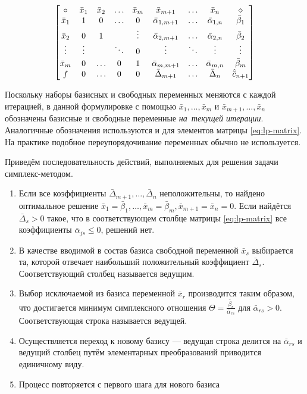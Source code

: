 \begin{equation}
  \label{eq:lp-matrix}
  \begin{bmatrix}
    \circ & \bar{x}_1 & \bar{x}_2 & \hdots & \bar{x}_m & \bar{x}_{m+1} & \hdots & \bar{x}_n & \diamond\\
    \bar{x}_1 & 1 & 0 & \hdots & 0  & \bar{\alpha}_{1,{m+1}} & \hdots & \bar{\alpha}_{1,n} & \bar{\beta}_1 \\
    \bar{x}_2 & 0 & 1 & & \vdots & \bar{\alpha}_{2,{m+1}} & \hdots & \bar{\alpha}_{2,n} & \bar{\beta}_2 \\
    \vdots & \vdots & &\vspace{2pt}\ddots  & 0 & \vdots & \ddots & \vdots & \vdots \\
    \bar{x}_m & 0 & \hdots & 0 & 1 & \bar{\alpha}_{m,{m+1}} & \hdots & \bar{\alpha}_{m,n} & \bar{\beta}_m \\
    f & 0 & \hdots & 0 & 0 & \bar{\Delta}_{m+1} & \hdots & \bar{\Delta}_n & \hat{\bar{c}}_{n+1}
  \end{bmatrix}
\end{equation}
\begin{rem}
  Поскольку наборы базисных и свободных переменных меняются с каждой
  итерацией, в данной формулировке с помощью
  $\bar{x}_1,\dotsc,\bar{x}_m$ и $\bar{x}_{m+1}, \dotsc, \bar{x}_n$
  обозначены базисные и свободные переменные \emph{на текущей
    итерации}. Аналогичные обозначения используются и для элементов
  матрицы \eqref{eq:lp-matrix}. На практике подобное
  переупорядочивание переменных обычно не используется.
\end{rem}

Приведём последовательность действий, выполняемых для решения задачи
симплекс-методом.
\begin{enumerate}
  \renewcommand{\labelenumi}{\textbf{Шаг \arabic{enumi}.}}
\item Если все коэффициенты $\bar{\Delta}_{m+1}, \dotsc,
  \bar{\Delta}_n$ неположительны, то найдено оптимальное решение
  $\bar{x}_1 = \bar{\beta}_1, \dotsc, \bar{x}_m = \bar{\beta}_m,
  \bar{x}_{m+1} = \bar{x}_n = 0$. Если найдётся $\bar{\Delta}_s > 0$
  такое, что в соответствующем столбце матрицы \eqref{eq:lp-matrix}
  все коэффициенты $\bar{\alpha}_{js} \leq 0$, решений нет.
\item В качестве вводимой в состав базиса свободной переменной
  $\bar{x}_s$ выбирается та, которой отвечает наибольший положительный
  коэффициент $\bar{\Delta}_s$. Соответствующий столбец называется
  ведущим.
\item Выбор исключаемой из базиса переменной $\bar{x}_r$ производится
  таким образом, что достигается минимум симплексного отношения
  $\Theta = \frac{\bar{\beta}_r}{\bar{\alpha}_{rs}}$ для
  $\bar{\alpha}_{rs} > 0$. Соответствующая строка называется ведущей.
\item Осуществляется переход к новому базису — ведущая строка делится
  на $\bar{\alpha}_{rs}$ и ведущий столбец путём элементарных
  преобразований приводится единичному виду.
\item Процесс повторяется с первого шага для нового базиса
\end{enumerate}

